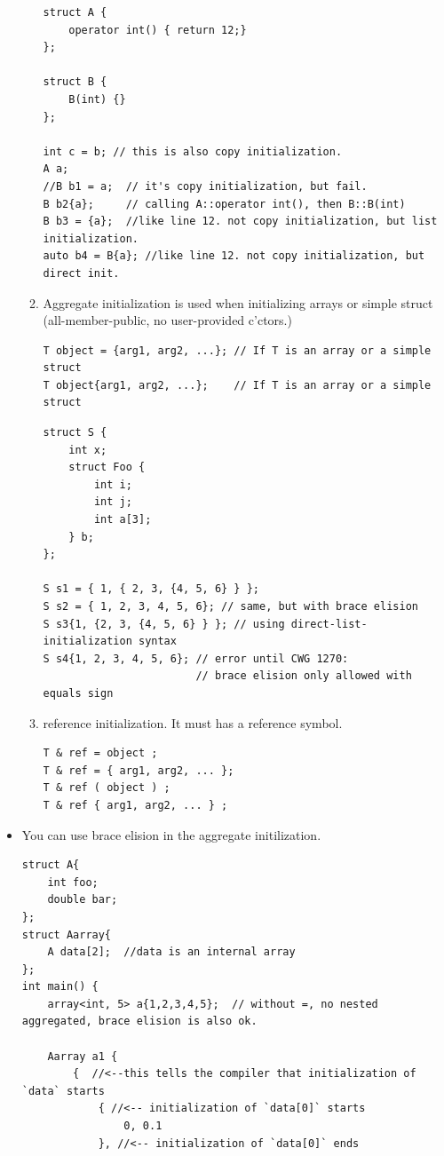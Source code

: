 \documentclass[a4paper,11pt,twoside]{book}
\begin{document}
\begin{itemize}
\begin{enumerate}
\begin{lstlisting}[]
struct A {
	operator int() { return 12;}
};

struct B {
	B(int) {}
};

int c = b; // this is also copy initialization. 
A a;
//B b1 = a;  // it's copy initialization, but fail. 
B b2{a};     // calling A::operator int(), then B::B(int)
B b3 = {a};  //like line 12. not copy initialization, but list initialization.
auto b4 = B{a}; //like line 12. not copy initialization, but direct init.
\end{lstlisting}

		\item Aggregate initialization is used when initializing arrays or simple struct (all-member-public, no user-provided c'ctors.)
\begin{lstlisting}[numbers=none]
T object = {arg1, arg2, ...}; // If T is an array or a simple struct
T object{arg1, arg2, ...};    // If T is an array or a simple struct
\end{lstlisting}

\begin{lstlisting}[numbers=none]
struct S {
	int x;
	struct Foo {
		int i;
		int j;
		int a[3];
	} b;
};

S s1 = { 1, { 2, 3, {4, 5, 6} } };
S s2 = { 1, 2, 3, 4, 5, 6}; // same, but with brace elision
S s3{1, {2, 3, {4, 5, 6} } }; // using direct-list-initialization syntax
S s4{1, 2, 3, 4, 5, 6}; // error until CWG 1270: 
						// brace elision only allowed with equals sign
\end{lstlisting}

		\item reference initialization. It must has a reference symbol.
\begin{lstlisting}[numbers=none]
T & ref = object ;
T & ref = { arg1, arg2, ... };
T & ref ( object ) ;
T & ref { arg1, arg2, ... } ;
\end{lstlisting}
	\end{enumerate}

    \item You can use brace elision in the aggregate initilization.
\begin{lstlisting}
struct A{
	int foo;
	double bar;
};
struct Aarray{
	A data[2];  //data is an internal array
};
int main() {
	array<int, 5> a{1,2,3,4,5};  // without =, no nested aggregated, brace elision is also ok.
	
	Aarray a1 {
		{  //<--this tells the compiler that initialization of `data` starts
			{ //<-- initialization of `data[0]` starts
				0, 0.1
			}, //<-- initialization of `data[0]` ends
			

\end{lstlisting}
\end{itemize}
\end{document}
